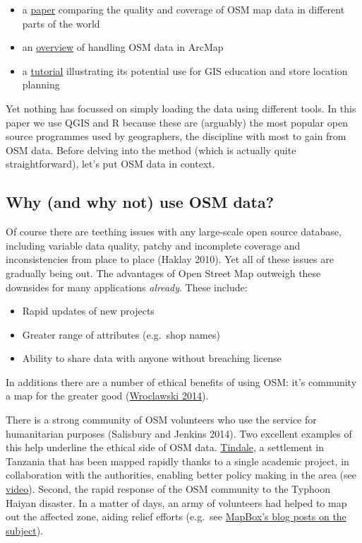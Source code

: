 \documentclass[]{article}
\begin{document}
\begin{itemize}
\item
  a \href{http://www.mdpi.com/1999-5903/5/2/282/pdf}{paper} comparing
  the quality and coverage of OSM map data in different parts of the
  world
\item
  an
  \href{http://www.library.carleton.ca/sites/default/files/help/gis/WorkingWithOpenStreetMap.pdf}{overview}
  of handling OSM data in ArcMap
\item
  a
  \href{http://elogeo.nottingham.ac.uk/xmlui/bitstream/handle/url/289/osm-tutorial-final-2.pdf?sequence=1}{tutorial}
  illustrating its potential use for GIS education and store location
  planning
\end{itemize}
Yet nothing has focussed on simply loading the data using different
tools. In this paper we use QGIS and R because these are (arguably) the
most popular open source programmes used by geographers, the discipline
with most to gain from OSM data. Before delving into the method (which
is actually quite straightforward), let's put OSM data in context.

\subsection{Why (and why not) use OSM data?}

Of course there are teething issues with any large-scale open source
database, including variable data quality, patchy and incomplete
coverage and inconsistencies from place to place (Haklay 2010). Yet all
of these issues are gradually being out. The advantages of Open Street
Map outweigh these downsides for many applications \emph{already}. These
include:

\begin{itemize}
\item
  Rapid updates of new projects
\item
  Greater range of attributes (e.g.~shop names)
\item
  Ability to share data with anyone without breaching license
\end{itemize}
In additions there are a number of ethical benefits of using OSM: it's
community a map for the greater good
(\href{http://www.theguardian.com/technology/2014/jan/14/why-the-world-needs-openstreetmap}{Wroclawski
2014}).

There is a strong community of OSM volunteers who use the service for
humanitarian purposes (Salisbury and Jenkins 2014). Two excellent
examples of this help underline the ethical side of OSM data.
\href{http://explore.ramanitanzania.org/}{Tindale}, a settlement in
Tanzania that has been mapped rapidly thanks to a single academic
project, in collaboration with the authorities, enabling better policy
making in the area (see
\href{http://www.youtube.com/watch?v=KqrGyvNnWkA}{video}). Second, the
rapid response of the OSM community to the Typhoon Haiyan disaster. In a
matter of days, an army of volunteers had helped to map out the affected
zone, aiding relief efforts (e.g.~see
\href{https://www.mapbox.com/blog/typhoon-haiyan-openstreetmap/}{MapBox's
blog posts on the subject}).
\end{document}
